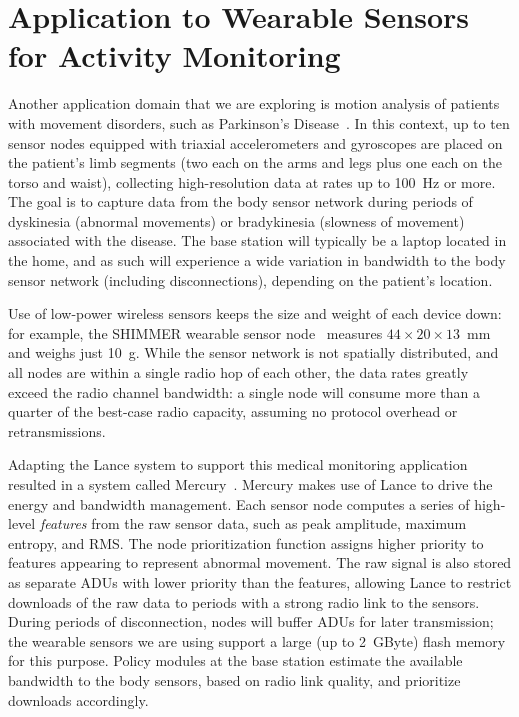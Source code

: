 \section{Application to Wearable Sensors for Activity Monitoring}
\label{lance-sec-mercury}

Another application domain that we are exploring is motion analysis of
patients with movement disorders, such as Parkinson's
Disease~\cite{parkinsons-embs07}. In this context, up to ten sensor nodes
equipped with triaxial accelerometers and gyroscopes are placed on the
patient's limb segments (two each on the arms and legs plus one each on the
torso and waist), collecting high-resolution data at rates up to 100~Hz or
more. The goal is to capture data from the body sensor network during periods
of dyskinesia (abnormal movements) or bradykinesia (slowness of movement)
associated with the disease. The base station will typically be a laptop
located in the home, and as such will experience a wide variation in
bandwidth to the body sensor network (including disconnections), depending on
the patient's location.

Use of low-power wireless sensors keeps the size and weight of each device
down: for example, the SHIMMER wearable sensor node~\cite{parkinsons-embs07}
measures $44 \times 20 \times 13$~mm and weighs just 10~g. While the sensor
network is not spatially distributed, and all nodes are within a single radio
hop of each other, the data rates greatly exceed the radio channel bandwidth:
a single node will consume more than a quarter of the best-case radio
capacity, assuming no protocol overhead or retransmissions.

Adapting the Lance system to support this medical monitoring application
resulted in a system called Mercury~\cite{mercury-sensys09}. Mercury makes
use of Lance to drive the energy and bandwidth management. Each sensor node
computes a series of high-level \textit{features} from the raw sensor data,
such as peak amplitude, maximum entropy, and RMS. The node prioritization
function assigns higher priority to features appearing to represent abnormal
movement. The raw signal is also stored as separate ADUs with lower priority
than the features, allowing Lance to restrict downloads of the raw data to
periods with a strong radio link to the sensors. During periods of
disconnection, nodes will buffer ADUs for later transmission; the wearable
sensors we are using support a large (up to 2~GByte) flash memory for this
purpose. Policy modules at the base station estimate the available bandwidth
to the body sensors, based on radio link quality, and prioritize downloads
accordingly.

